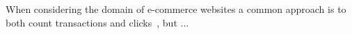 When considering the domain of e-commerce websites a common approach is to both
count transactions and clicks~\cite{something}, but ...




